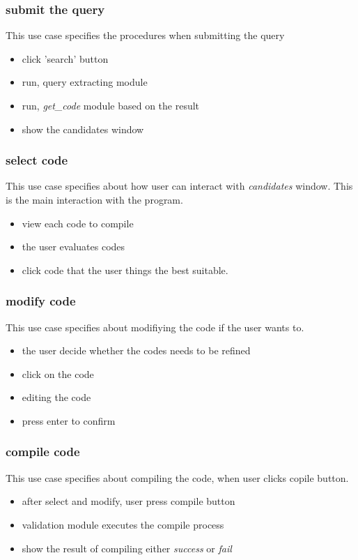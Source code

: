 \documentclass[conference]{IEEEtran}
\begin{document}
\subsubsection{submit the query}
This use case specifies the procedures when submitting the query
\begin{itemize}
  \item click 'search' button
  \item run, query extracting module
  \item run, \textit{get\_code} module based on the result
  \item show the candidates window
\end{itemize}
\textit{}


\subsubsection{select code}
This use case specifies about how user can interact with \textit{candidates} window. This is the main interaction with the program.
\begin{itemize}
  \item view each code to compile
  \item the user evaluates codes
  \item click code that the user things the best suitable.
\end{itemize}
\textit{}



\subsubsection{modify code}
This use case specifies about modifiying the code if the user wants to.
\begin{itemize}
  \item the user decide whether the codes needs to be refined
  \item click on the code
  \item editing the code
  \item press enter to confirm
\end{itemize}
\textit{}


\subsubsection{compile code}
This use case specifies about compiling the code, when user clicks copile button.
\begin{itemize}
  \item after select and modify, user press compile button
  \item validation module executes the compile process
  \item show the result of compiling either \textit{success} or \textit{fail}
\end{itemize}
\textit{}
\end{document}
